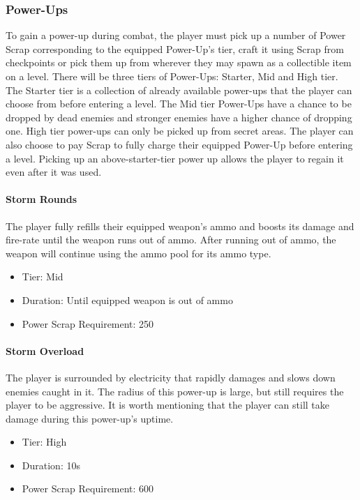 \documentclass[12pt]{article}
\begin{document}
\subsubsection{Power-Ups}

To gain a power-up during combat, the player must pick up a number of Power Scrap corresponding to the equipped Power-Up's tier, craft it using Scrap from checkpoints or pick them up from wherever they may spawn as a collectible item on a level. There will be three tiers of Power-Ups: Starter, Mid and High tier. The Starter tier is a collection of already available power-ups that the player can choose from before entering a level. The Mid tier Power-Ups have a chance to be dropped by dead enemies and stronger enemies have a higher chance of dropping one. High tier power-ups can only be picked up from secret areas. The player can also choose to pay Scrap to fully charge their equipped Power-Up before entering a level. Picking up an above-starter-tier power up allows the player to regain it even after it was used. 

\paragraph{Storm Rounds}

The player fully refills their equipped weapon's ammo and boosts its damage and fire-rate until the weapon runs out of ammo. After running out of ammo, the weapon will continue using the ammo pool for its ammo type. 

\begin{itemize}
	\item Tier: Mid
	\item Duration: Until equipped weapon is out of ammo
	\item Power Scrap Requirement: 250
\end{itemize}

\paragraph{Storm Overload}

The player is surrounded by electricity that rapidly damages and slows down enemies caught in it. The radius of this power-up is large, but still requires the player to be aggressive. It is worth mentioning that the player can still take damage during this power-up's uptime. 

\begin{itemize}
	\item Tier: High
	\item Duration: 10s
	\item Power Scrap Requirement: 600
\end{itemize}
\end{document}
